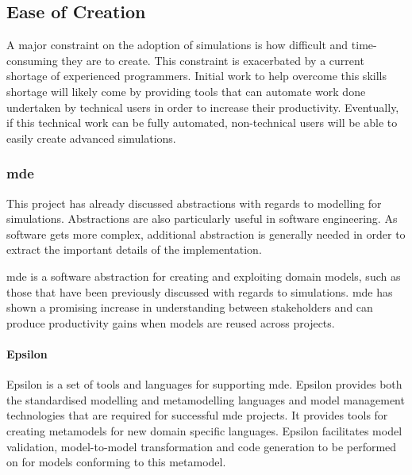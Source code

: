 \documentclass{UoYCSproject}
\begin{document}
\subsection{Ease of Creation}
A major constraint on the adoption of simulations is how difficult and time-consuming they are to create.
This constraint is exacerbated by a current shortage of experienced programmers.
Initial work to help overcome this skills shortage will likely come by providing tools that can automate work done undertaken by technical users in order to increase their productivity.
Eventually, if this technical work can be fully automated, non-technical users will be able to easily create advanced simulations.



\subsubsection{\acrlong{mde}}
This project has already discussed abstractions with regards to modelling for simulations.
Abstractions are also particularly useful in software engineering.
As software gets more complex, additional abstraction is generally needed in order to extract the important details of the implementation\cite[p.24]{csapp}.

\gls{mde} is a software abstraction for creating and exploiting domain models, such as those that have been previously discussed with regards to simulations.
\gls{mde} has shown a promising increase in understanding between stakeholders and can produce productivity gains when models are reused across projects\cite{mde_industry_review}.

\paragraph{Epsilon} Epsilon is a set of tools and languages for supporting \gls{mde}.
Epsilon provides both the standardised modelling and metamodelling languages and model management technologies that are required for successful \gls{mde} projects\cite{eol}.
It provides tools for creating metamodels for new domain specific languages.
Epsilon facilitates model validation, model-to-model transformation and code generation to be performed on for models conforming to this metamodel.\cite{epsilon_book}
\end{document}
